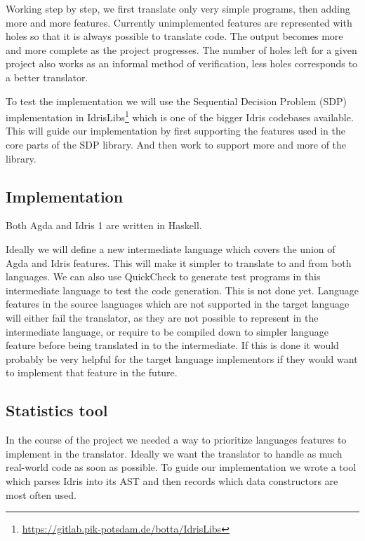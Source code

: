 \documentclass[parskip=half]{scrartcl}
\begin{document}
Working step by step, we first translate only very simple programs, then adding
more and more features. Currently unimplemented features are represented with
holes so that it is always possible to translate code. The output becomes more
and more complete as the project progresses. The number of holes left for
a given project also works as an informal method of verification, less holes
corresponds to a better translator.

To test the implementation we will use the Sequential Decision Problem (SDP)
implementation in
IdrisLibs\footnote{\url{https://gitlab.pik-potsdam.de/botta/IdrisLibs}} which
is one of the bigger Idris codebases available. This will guide our
implementation by first supporting the features used in the core parts of the
SDP library. And then work to support more and more of the library.

\subsection{Implementation}
Both Agda and Idris 1 are written in Haskell.



Ideally we will define a new intermediate language which covers the union of
Agda and Idris features. This will make it simpler to translate to and from
both languages. We can also use QuickCheck to generate test programs in this
intermediate language to test the code generation. This is not done yet.
Language features in the source languages which are not supported in the target
language will either fail the translator, as they are not possible to represent
in the intermediate language, or require to be compiled down to simpler
language feature before being translated in to the intermediate. If this is
done it would probably be very helpful for the target language implementors if
they would want to implement that feature in the future.



\subsection{Statistics tool}
In the course of the project we needed a way to prioritize languages features
to implement in the translator. Ideally we want the translator to handle
as much real-world code as soon as possible. To guide our implementation we
wrote a tool which parses Idris into its AST and then records which data
constructors are most often used.
\end{document}
